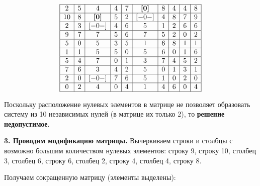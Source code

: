 \documentclass[17pt]{extarticle}
\begin{document}
\[
    \begin{array}{|*{10}{c|}}
        \hline
        2  & 5 & 4            & 4 & 7 & \textbf{[0]} & 8 & 4 & 4 & 8 \\
        \hline
        10 & 8 & \textbf{[0]} & 5 & 2 & [-0-]        & 4 & 8 & 7 & 9 \\
        \hline
        2  & 3 & [-0-]        & 4 & 6 & 5            & 1 & 2 & 6 & 6 \\
        \hline
        9  & 7 & 7            & 5 & 6 & 7            & 5 & 2 & 0 & 2 \\
        \hline
        5  & 0 & 5            & 3 & 5 & 1            & 6 & 8 & 1 & 1 \\
        \hline
        1  & 1 & 5            & 5 & 0 & 5            & 6 & 0 & 1 & 6 \\
        \hline
        5  & 4 & 7            & 0 & 1 & 3            & 7 & 4 & 5 & 2 \\
        \hline
        7  & 6 & 3            & 4 & 2 & 5            & 0 & 1 & 3 & 1 \\
        \hline
        2  & 0 & [-0-]        & 7 & 6 & 5            & 1 & 0 & 2 & 0 \\
        \hline
        0  & 2 & 4            & 0 & 4 & 1            & 4 & 6 & 0 & 4 \\
        \hline
    \end{array}
\]

Поскольку расположение нулевых элементов в матрице не позволяет образовать систему из 10 независимых нулей (в матрице их только 2), то \textbf{решение недопустимое}.

\textbf{3. Проводим модификацию матрицы.} Вычеркиваем строки и столбцы с возможно большим количеством нулевых элементов:
строку 9, строку 10, столбец 3, столбец 6, строку 6, столбец 2, строку 4, столбец 4, строку 8.

Получаем сокращенную матрицу (элементы выделены):
\end{document}
